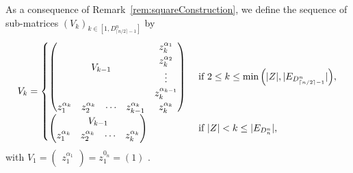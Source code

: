 \documentclass[11pt]{llncs}
\begin{document}
\begin{definition}\label{def:inductiveConstructionOfV}
    As a consequence of Remark~\ref{rem:squareConstruction}, we define the sequence of sub-matrices $\left(V_k\right)_{k\in [1,D_{\lceil{n/2}\rceil-1}^n]}$ by
    \begin{align*}
        V_k = 
        \begin{cases}
            \begin{pmatrix}
        \multicolumn{4}{c}{\multirow{4}{*}{$V_{k-1}$}} & z_k^{\alpha_{1}}\\
        & & & & z_k^{\alpha_{2}}\\
        & & & & \vdots\\
        & & & & z_k^{\alpha_{k-1}}\\
        z_1^{\alpha_{k}} & z_{2}^{\alpha_k}& \cdots & z_{k-1}^{\alpha_{k}} & z_{k}^{\alpha_{k}}
    \end{pmatrix} & \mbox{ if } 2\leq k \leq \min{\left(|Z|, |E_{D_{\lceil{n/2}\rceil-1}^n}|\right)},\\
    \begin{pmatrix}
        \multicolumn{4}{c}{\multirow{1}{*}{$V_{k-1}$}} \\
        z_1^{\alpha_k} & z_2^{\alpha_k} & \cdots & z_{k}^{\alpha_k}
    \end{pmatrix} & \mbox{ if } |Z| < k \leq |E_{D_n^n}|,
        \end{cases}
    \end{align*}
    with $V_1 = \begin{pmatrix} z_1^{\alpha_1}\end{pmatrix} = z_1^{0_n} = (1)$ .
\end{definition}
\end{document}
